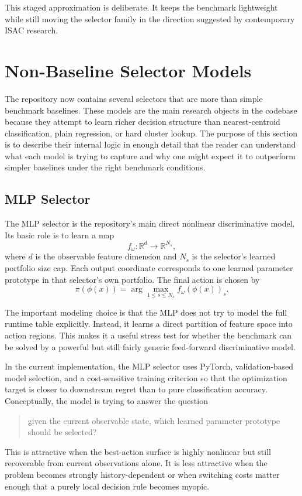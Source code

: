\documentclass[11pt]{report}
\begin{document}
This staged approximation is deliberate. It keeps the benchmark lightweight while still moving the selector family in the direction suggested by contemporary ISAC research.

\section{Non-Baseline Selector Models}

The repository now contains several selectors that are more than simple benchmark baselines. These models are the main research objects in the codebase because they attempt to learn richer decision structure than nearest-centroid classification, plain regression, or hard cluster lookup. The purpose of this section is to describe their internal logic in enough detail that the reader can understand what each model is trying to capture and why one might expect it to outperform simpler baselines under the right benchmark conditions.

\subsection{MLP Selector}

The MLP selector is the repository's main direct nonlinear discriminative model. Its basic role is to learn a map
\[
f_\omega : \mathbb{R}^d \to \mathbb{R}^{N_s},
\]
where $d$ is the observable feature dimension and $N_s$ is the selector's learned portfolio size cap. Each output coordinate corresponds to one learned parameter prototype in that selector's own portfolio. The final action is chosen by
\[
\pi(\phi(x)) = \arg\max_{1 \le s \le N_s} f_\omega(\phi(x))_s.
\]

The important modeling choice is that the MLP does not try to model the full runtime table explicitly. Instead, it learns a direct partition of feature space into action regions. This makes it a useful stress test for whether the benchmark can be solved by a powerful but still fairly generic feed-forward discriminative model.

In the current implementation, the MLP selector uses PyTorch, validation-based model selection, and a cost-sensitive training criterion so that the optimization target is closer to downstream regret than to pure classification accuracy. Conceptually, the model is trying to answer the question
\begin{quote}
given the current observable state, which learned parameter prototype should be selected?
\end{quote}
This is attractive when the best-action surface is highly nonlinear but still recoverable from current observations alone. It is less attractive when the problem becomes strongly history-dependent or when switching costs matter enough that a purely local decision rule becomes myopic.
\end{document}
